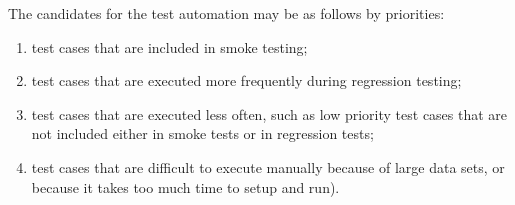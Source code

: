 The candidates for the test automation may be as follows by priorities:

 \begin{enumerate}
\item 
   test cases that are included in smoke testing;
\item 
test cases that are executed more frequently during regression testing;
\item 
test cases that are executed less often, such as low priority test cases that are not included either in smoke tests or in regression tests;
\item 
test cases that are difficult to execute manually because of large data sets, or because it takes too much time to setup and run).                                                                                                                                      \end{enumerate}